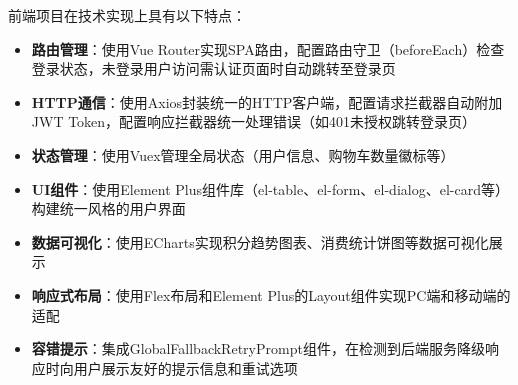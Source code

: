 前端项目在技术实现上具有以下特点：

\begin{itemize}
	\item \textbf{路由管理}：使用Vue Router实现SPA路由，配置路由守卫（beforeEach）检查登录状态，未登录用户访问需认证页面时自动跳转至登录页
	\item \textbf{HTTP通信}：使用Axios封装统一的HTTP客户端，配置请求拦截器自动附加JWT Token，配置响应拦截器统一处理错误（如401未授权跳转登录页）
	\item \textbf{状态管理}：使用Vuex管理全局状态（用户信息、购物车数量徽标等）
	\item \textbf{UI组件}：使用Element Plus组件库（el-table、el-form、el-dialog、el-card等）构建统一风格的用户界面
	\item \textbf{数据可视化}：使用ECharts实现积分趋势图表、消费统计饼图等数据可视化展示
	\item \textbf{响应式布局}：使用Flex布局和Element Plus的Layout组件实现PC端和移动端的适配
	\item \textbf{容错提示}：集成GlobalFallbackRetryPrompt组件，在检测到后端服务降级响应时向用户展示友好的提示信息和重试选项
\end{itemize}


